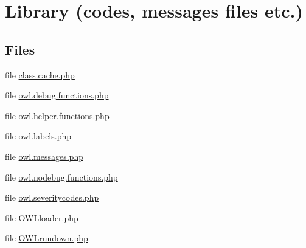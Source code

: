 \section{Library (codes, messages files etc.)}
\label{group__OWL__LIBRARY}
\subsection*{Files}
\begin{DoxyCompactItemize}
\item 
file \hyperlink{class_8cache_8php}{class.cache.php}
\item 
file \hyperlink{owl_8debug_8functions_8php}{owl.debug.functions.php}
\item 
file \hyperlink{owl_8helper_8functions_8php}{owl.helper.functions.php}
\item 
file \hyperlink{owl_8labels_8php}{owl.labels.php}
\item 
file \hyperlink{owl_8messages_8php}{owl.messages.php}
\item 
file \hyperlink{owl_8nodebug_8functions_8php}{owl.nodebug.functions.php}
\item 
file \hyperlink{owl_8severitycodes_8php}{owl.severitycodes.php}
\item 
file \hyperlink{OWLloader_8php}{OWLloader.php}
\item 
file \hyperlink{OWLrundown_8php}{OWLrundown.php}
\end{DoxyCompactItemize}
